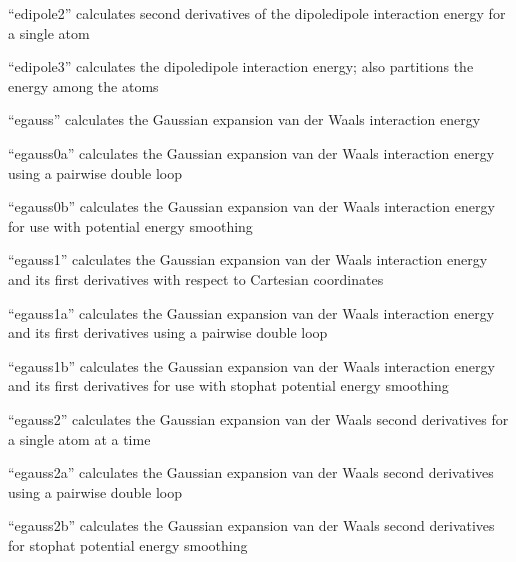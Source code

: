\documentclass[letterpaper,11pt,english]{sphinxmanual}
\begin{document}
“edipole2” calculates second derivatives of the dipole\sphinxhyphen{}dipole interaction energy for a single atom


“edipole3” calculates the dipole\sphinxhyphen{}dipole interaction energy; also partitions the energy among the atoms


“egauss” calculates the Gaussian expansion van der Waals interaction energy


“egauss0a” calculates the Gaussian expansion van der Waals interaction energy using a pairwise double loop


“egauss0b” calculates the Gaussian expansion van der Waals interaction energy for use with potential energy smoothing


“egauss1” calculates the Gaussian expansion van der Waals interaction energy and its first derivatives with respect to Cartesian coordinates


“egauss1a” calculates the Gaussian expansion van der Waals interaction energy and its first derivatives using a pairwise double loop


“egauss1b” calculates the Gaussian expansion van der Waals interaction energy and its first derivatives for use with stophat potential energy smoothing


“egauss2” calculates the Gaussian expansion van der Waals second derivatives for a single atom at a time


“egauss2a” calculates the Gaussian expansion van der Waals second derivatives using a pairwise double loop


“egauss2b” calculates the Gaussian expansion van der Waals second derivatives for stophat potential energy smoothing

\end{document}
